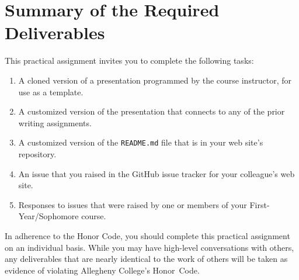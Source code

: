 \vspace*{-.175in}
\section*{Summary of the Required Deliverables}

This practical assignment invites you to complete the following tasks:

\vspace*{-.1in}
\begin{enumerate}
  \setlength{\itemsep}{0in}

  \item A cloned version of a presentation programmed by the course instructor, for use as a template.
  \item A customized version of the presentation that connects to any of the prior writing assignments.
  \item A customized version of the {\tt README.md} file that is in your web site's repository.
  \item An issue that you raised in the GitHub issue tracker for your colleague's web site.
  \item Responses to issues that were raised by one or members of your First-Year/Sophomore course.

\end{enumerate}
\vspace*{-.1in}

In adherence to the Honor Code, you should complete this practical assignment on an individual basis. While you may have
high-level conversations with others, any deliverables that are nearly identical to the work of others will be taken as
evidence of violating Allegheny College's \mbox{Honor Code}.


